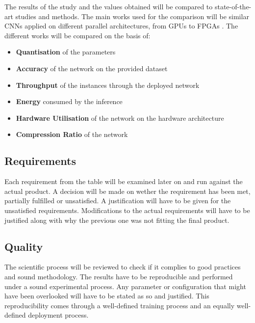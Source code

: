 The results of the study and the values obtained will be compared to state-of-the-art studies and methods. The main works used for the comparison will be similar CNNs applied on different parallel architectures, from GPUs \cite{Micikevicius2017, Jia2018, Kurth2018} to FPGAs \cite{Zhao2016, Colangelo2018, Jahanshahi2019, Bacchus2020}. The different works will be compared on the basis of:
\begin{itemize}
  \item \textbf{Quantisation} of the parameters
  \item \textbf{Accuracy} of the network on the provided dataset
  \item \textbf{Throughput} of the instances through the deployed network
  \item \textbf{Energy} consumed by the inference
  \item \textbf{Hardware Utilisation} of the network on the hardware architecture
  \item \textbf{Compression Ratio} of the network
\end{itemize}


\subsection{Requirements}

Each requirement from the table will be examined later on and run against the actual product. A decision will be made on wether the requirement has been met, partially fulfilled or unsatisfied. A justification will have to be given for the unsatisfied requirements. Modifications to the actual requirements will have to be justified along with why the previous one was not fitting the final product.


\subsection{Quality}

The scientific process will be reviewed to check if it complies to good practices and sound methodology. The results have to be reproducible and performed under a sound experimental process. Any parameter or configuration that might have been overlooked will have to be stated as so and justified. This reproducibility comes through a well-defined training process and an equally well-defined deployment process.
